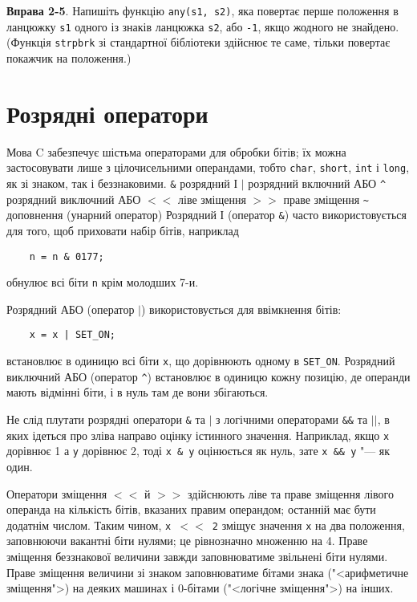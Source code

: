 \documentclass[a4paper,12pt]{book}
\begin{document}
  \textbf{Вправа 2-5}. Напишіть функцію \texttt{any(s1, s2)}, яка повертає перше положення в
  ланцюжку \texttt{s1} одного із знаків ланцюжка \texttt{s2}, або \texttt{-1}, якщо
  жодного не знайдено. (Функція \texttt{strpbrk} зі стандартної бібліотеки здійснює те
  саме, тільки повертає покажчик на положення.)

\section{Розрядні оператори}


    Мова C забезпечує шістьма операторами для обробки
    бітів; їх можна застосовувати лише з цілочисельними операндами, тобто
    \texttt{char},
    \texttt{short},
    \texttt{int} і
    \texttt{long}, як зі знаком, так і беззнаковими.
    {\centering                             \texttt{\&}
                розрядний І
                              \texttt{\mbox{$|$}}
                розрядний включний АБО
                              \texttt{\^{}}
                розрядний виключний АБО
                            \texttt{\mbox{$<$}\mbox{$<$}}\* \* \*
        ліве зміщення
                              \texttt{\mbox{$>$}\mbox{$>$}}
                праве зміщення
                              \texttt{\~{}}
                доповнення (унарний оператор)
            }
  Розрядний І (оператор \texttt{\&}) часто використовується для того, щоб приховати
  набір бітів, наприклад
  \begin{verbatim}
    n = n & 0177;
  \end{verbatim}
  обнулює всі біти \texttt{n} крім молодших 7-и.

  Розрядний АБО (оператор \texttt{\mbox{$|$}}) використовується для ввімкнення бітів:
  \begin{verbatim}
    x = x | SET_ON;
  \end{verbatim}
  встановлює в одиницю всі біти \texttt{x}, що дорівнюють одному в \texttt{SET\_ON}.
  Розрядний виключний АБО (оператор \texttt{\^{}}) встановлює в одиницю кожну позицію, де
  операнди мають відмінні біти, і в нуль там де вони збігаються.

  Не слід плутати розрядні оператори \texttt{\&} та \texttt{\mbox{$|$}} з логічними операторами
  \texttt{\&\&} та \texttt{\mbox{$|$}\mbox{$|$}}, в яких ідеться про зліва направо оцінку істинного
  значення. Наприклад, якщо \texttt{x} дорівнює 1 а \texttt{y} дорівнює 2, тоді \texttt{x
  \& y} оцінюється як нуль, зате \texttt{x \&\& y} "--- як один.

  Оператори зміщення \texttt{\mbox{$<$}\mbox{$<$}} й \texttt{\mbox{$>$}\mbox{$>$}} здійснюють ліве та праве
  зміщення лівого операнда на кількість бітів, вказаних правим операндом; останній має
  бути додатнім числом. Таким чином, \texttt{x \mbox{$<$}\mbox{$<$} 2} зміщує значення \texttt{x} на
  два положення, заповнюючи вакантні біти нулями; це рівнозначно множенню на 4. Праве
  зміщення беззнакової величини завжди заповнюватиме звільнені біти нулями. Праве зміщення
  величини зі знаком заповнюватиме бітами знака ("<арифметичне зміщення">) на
  деяких машинах і 0-бітами ("<логічне зміщення">) на інших.
\end{document}
